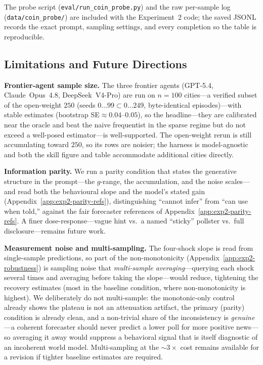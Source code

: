 \documentclass{article} %
\begin{document}
The probe script (\texttt{eval/run\_coin\_probe.py}) and the raw per-sample log
(\texttt{data/coin\_probe/}) are included with the Experiment~2 code; the saved JSONL records the
exact prompt, sampling settings, and every completion so the table is reproducible.

\subsection{Limitations and Future Directions}
\label{app:exp2-limitations}

\textbf{Frontier-agent sample size.}  The three frontier agents (GPT-5.4, Claude~Opus~4.8,
DeepSeek~V4-Pro) are run on $n{=}100$ cities---a verified subset of the open-weight $250$ (seeds
$0\ldots99\subset0\ldots249$, byte-identical episodes)---with stable estimates (bootstrap
SE${\approx}0.04$--$0.05$), so the headline---they are calibrated near the oracle and beat the naive
frequentist in the sparse regime but do not exceed a well-posed estimator---is well-supported.  The
open-weight rerun is still accumulating toward $250$, so its rows are noisier; the harness is
model-agnostic and both the skill figure and table accommodate additional cities directly.

\textbf{Information parity.}  We run a parity condition that states the generative structure in the
prompt---the $g$-range, the accumulation, and the noise scales---and read both the behavioural
slope and the model's stated gain (Appendix~\ref{app:exp2-parity-refs}), distinguishing ``cannot
infer'' from ``can use when told,'' against the fair forecaster references of
Appendix~\ref{app:exp2-parity-refs}.  A finer dose-response---vague hint vs.\ a named ``sticky''
pollster vs.\ full disclosure---remains future work.

\textbf{Measurement noise and multi-sampling.}  The four-shock slope is read from single-sample
predictions, so part of the non-monotonicity (Appendix~\ref{app:exp2-robustness}) is sampling noise
that \emph{multi-sample averaging}---querying each shock several times and averaging before taking
the slope---would reduce, tightening the recovery estimates (most in the baseline condition, where
non-monotonicity is highest).  We deliberately do not multi-sample: the monotonic-only control
already shows the plateau is not an attenuation artifact, the primary (parity) condition is already
clean, and a non-trivial share of the inconsistency is \emph{genuine}---a coherent forecaster
should never predict a lower poll for more positive news---so averaging it away would suppress a
behavioral signal that is itself diagnostic of an incoherent world model.  Multi-sampling at the
$\sim$$3\times$ cost remains available for a revision if tighter baseline estimates are required.
\end{document}

